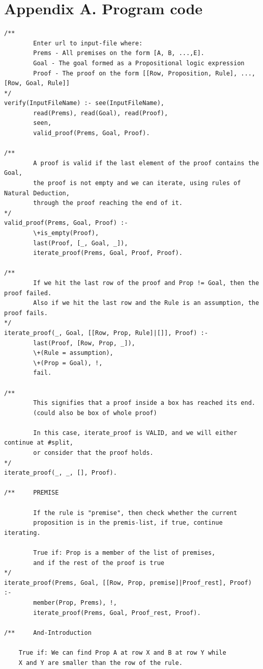 \documentclass[a4paper]{article}
\begin{document}
\section{Appendix A. Program code}
\begin{verbatim}
/**
        Enter url to input-file where:
        Prems - All premises on the form [A, B, ...,E].
        Goal - The goal formed as a Propositional logic expression
        Proof - The proof on the form [[Row, Proposition, Rule], ..., [Row, Goal, Rule]]
*/
verify(InputFileName) :- see(InputFileName),
        read(Prems), read(Goal), read(Proof),
        seen,
        valid_proof(Prems, Goal, Proof).

/**
        A proof is valid if the last element of the proof contains the Goal,
        the proof is not empty and we can iterate, using rules of Natural Deduction,
        through the proof reaching the end of it.
*/
valid_proof(Prems, Goal, Proof) :-
        \+is_empty(Proof),
        last(Proof, [_, Goal, _]),
        iterate_proof(Prems, Goal, Proof, Proof).

/**
        If we hit the last row of the proof and Prop != Goal, then the proof failed.
        Also if we hit the last row and the Rule is an assumption, the proof fails.
*/
iterate_proof(_, Goal, [[Row, Prop, Rule]|[]], Proof) :-
        last(Proof, [Row, Prop, _]),
        \+(Rule = assumption),
        \+(Prop = Goal), !,
        fail.

/**
        This signifies that a proof inside a box has reached its end. 
        (could also be box of whole proof)

        In this case, iterate_proof is VALID, and we will either continue at #split,
        or consider that the proof holds.
*/
iterate_proof(_, _, [], Proof).

/**     PREMISE

        If the rule is "premise", then check whether the current
        proposition is in the premis-list, if true, continue iterating.
        
        True if: Prop is a member of the list of premises, 
        and if the rest of the proof is true
*/
iterate_proof(Prems, Goal, [[Row, Prop, premise]|Proof_rest], Proof) :-
        member(Prop, Prems), !,
        iterate_proof(Prems, Goal, Proof_rest, Proof).

/**     And-Introduction

	True if: We can find Prop A at row X and B at row Y while
	X and Y are smaller than the row of the rule.
		

\end{verbatim}
\end{document}
